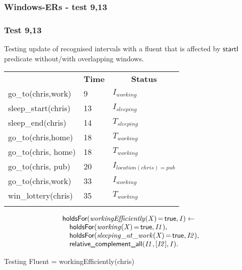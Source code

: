 \documentclass[8pt]{beamer}
\DeclareMathOperator{\val}{=}  %
\def \patsize {}
\def\holdsFor{\textsf{\patsize holdsFor}}
\def\startI{\textsf{\patsize startI}}
\def\complementall{\textsf{\patsize relative\_complement\_all}}
\def\true{\textsf{\patsize true}}
\newenvironment{mysplit}%
  {\arraycolsep 0pt \begin{array}{l}}%
  {\end{array}}
\begin{document}
\begin{frame}
    \frametitle{Windows-ERs - test 9,13}
    \subsubsection{Test 9,13}
    \small
    Testing update of recognised intervals with a fluent that is affected by $\startI$ predicate without/with overlapping windows.\linebreak
    \begin{minipage}{0.48\linewidth}
        \begin{table}[t!]
            \begin{center}
                \begin{tabular}{lll}
                    \hline\noalign{\smallskip}
                    \multicolumn{1}{l}{\textbf{Event}} & \multicolumn{1}{c}{\textbf{Time}} & \multicolumn{1}{c}{\textbf{Status}}  \\
                    go\_to(chris,work)& 9 & $I_{working}$\\
                    sleep\_start(chris)& 13 &$I_{sleeping}$\\
                    sleep\_end(chris)& 14 &$T_{sleeping}$\\
                    go\_to(chris,home)& 18 &$T_{working}$\\
                    go\_to(chris, home)& 18 &$T_{working}$\\
                    go\_to(chris, pub)& 20 & $I_{location(chris)=pub}$\\
                    go\_to(chris,work)& 33&$I_{working}$\\
                    win\_lottery(chris)& 35&$T_{working}$\\
                    \noalign{\smallskip}
                    \hline
                \end{tabular}
            \end{center}
        \end{table}
    \end{minipage}
    \begin{minipage}{0.48\linewidth}

        \begin{align*}
            \begin{mysplit}
                \holdsFor\mathit{(workingEfficiently(X)\val\true,I)\leftarrow}\\
                \quad    \holdsFor\mathit{(working(X)\val\true,I1),}\\
                \quad    \holdsFor\mathit{(sleeping\_at\_work(X)\val\true,I2),}\\
                \quad    \complementall\mathit{(I1,[I2],I).}\\
            \end{mysplit}
        \end{align*}
    \end{minipage}
    Testing Fluent = workingEfficiently(chris)


\end{frame}
\end{document}
